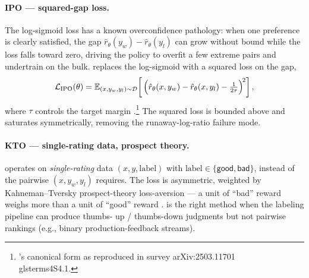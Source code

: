 \paragraph{IPO --- squared-gap loss.} The  log-sigmoid loss has a
known overconfidence pathology: when one preference is clearly
satisfied, the  gap $\hat r_\theta(y_w) - \hat
r_\theta(y_l)$ can grow without bound while the loss falls toward zero,
driving the policy to overfit a few extreme pairs and undertrain on the
bulk.  replaces the log-sigmoid with a squared loss on the gap,
\begin{equation}
\mathcal{L}_{\mathrm{IPO}}(\theta)
  = \operatorname{\mathbb{E}}_{(x, y_w, y_l) \sim \mathcal{D}}
    \!\left[\,\Big(\hat{r}_\theta(x, y_w) - \hat{r}_\theta(x, y_l)
                   - \tfrac{1}{2\tau}\Big)^{\!2}\right],
\label{eq:ipo}
\end{equation}
where $\tau$ controls the target margin
\citep[Azar et al.\ 2023; Eq.~17 in the paper's IPO derivation]{rafailov2023-dpo}.\footnote{'s
canonical form as reproduced in  survey arXiv:2503.11701 \\glsterm{s4}{S4}.1.}
The squared loss is bounded above and saturates symmetrically, removing
the runaway-log-ratio failure mode.

\paragraph{KTO --- single-rating data, prospect theory.}  operates
on \emph{single-rating} data $(x, y, \mathrm{label})$ with
$\mathrm{label} \in \{\textsf{good}, \textsf{bad}\}$, instead of the
pairwise $(x, y_w, y_l)$  requires. The loss is asymmetric, weighted
by Kahneman--Tversky prospect-theory loss-aversion --- a unit of
``bad'' reward weighs more than a unit of ``good'' reward
\citep[Ethayarajh et al.\ 2024]{rafailov2023-dpo}.
 is the right method when the labeling pipeline can produce thumbs-
up / thumbs-down judgments but not pairwise rankings (e.g., binary
production-feedback streams).

